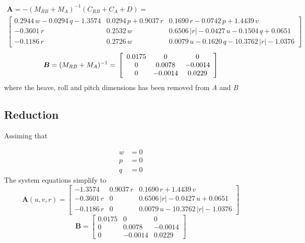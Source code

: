 \documentclass[12pt,a4]{article}
\begin{document}
\begin{multline}
	\bm{A} =  -(M_{RB} + M_A)^{-1}(C_{RB}+C_A+D) = \\
	\left[\begin{array}{ccc}
			0.2944\,w-0.0294\,q-1.3574 & 0.0294\,p+0.9037\,r & 0.1690\,r-0.0742\,p+1.4439\,v                      \\
			-0.3601\,r                 & 0.2532\,w           & 0.6506\,\left|r\right|-0.0427\,u-0.1504\,q+0.0651  \\
			-0.1186\,r                 & 0.2726\,w           & 0.0079\,u-0.1620\,q-10.3762\,\left|r\right|-1.0376
		\end{array}\right]
\end{multline}
\begin{equation}
	\bm{B} = (M_{RB} + M_A)^{-1}=  \\
	\left[\begin{array}{ccc}
			0.0175 & 0       & 0       \\
			0      & 0.0078  & -0.0014 \\
			0      & -0.0014 & 0.0229
		\end{array}\right]
\end{equation}
where the heave, roll and pitch dimensions has been removed from \textit{A} and \textit{B}

\subsection{Reduction}

Assiming that

\begin{align*}
	w & = 0 \\
	p & = 0 \\
	q & = 0
\end{align*}
The system equations simplify to
\begin{equation*}
	\bm{A}(u,v,r) =
	\left[\begin{array}{ccc}
			-1.3574    & 0.9037\,r & 0.1690\,r+1.4439\,v                      \\
			-0.3601\,r & 0         & 0.6506\,\left|r\right|-0.0427\,u+0.0651  \\
			-0.1186\,r & 0         & 0.0079\,u-10.3762\,\left|r\right|-1.0376
		\end{array}\right]
\end{equation*}
\begin{equation*}
	\bm{B} =
	\left[\begin{array}{ccc}
			0.0175 & 0       & 0       \\
			0      & 0.0078  & -0.0014 \\
			0      & -0.0014 & 0.0229
		\end{array}\right]
\end{equation*}
\end{document}
